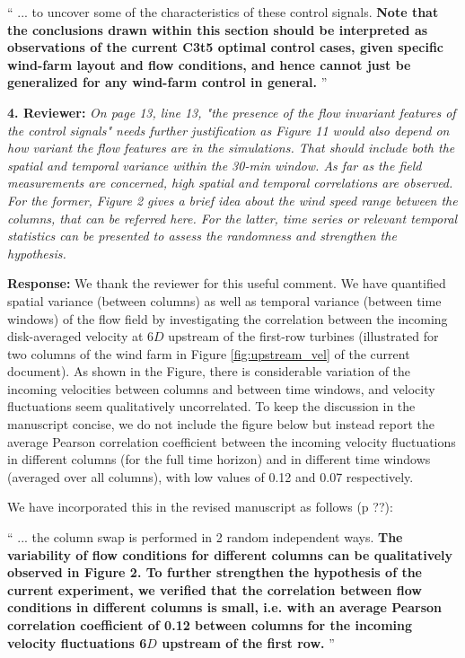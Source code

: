 \documentclass[]{article}
\begin{document}
`` 
... to uncover some of the characteristics of these control signals. \textbf{Note that the conclusions drawn within this section should be interpreted as observations of the current C3t5 optimal control cases, given specific wind-farm layout and flow conditions, and hence cannot just be generalized for any wind-farm control in general.}
''


\dotfill

\textbf{4. Reviewer: } \textit{On page 13, line 13, "the presence of the flow invariant features of the control signals"
	needs further justification as Figure 11 would also depend on how variant the flow
	features are in the simulations. That should include both the spatial and temporal
	variance within the 30-min window. As far as the field measurements are concerned,
	high spatial and temporal correlations are observed. For the former, Figure 2 gives a
	brief idea about the wind speed range between the columns, that can be referred here.
	For the latter, time series or relevant temporal statistics can be presented to assess the
	randomness and strengthen the hypothesis.}

\textbf{Response: } We thank the reviewer for this useful comment. We have quantified spatial variance (between columns) as well as temporal variance (between time windows) of the flow field by investigating the correlation between the incoming disk-averaged velocity at 6$D$ upstream of the first-row turbines (illustrated for two columns of the wind farm in Figure \ref{fig:upstream_vel} of the current document). As shown in the Figure, there is considerable variation of the incoming velocities between columns and between time windows, and velocity fluctuations seem qualitatively uncorrelated. To keep the discussion in the manuscript concise, we do not include the figure below but instead report the average Pearson correlation coefficient between the incoming velocity fluctuations in different columns (for the full time horizon) and in different time windows (averaged over all columns), with low values of 0.12 and 0.07 respectively. 

We have incorporated this in the revised manuscript as follows (p ??): 

``
... the column swap is performed in 2 random independent ways. \textbf{The variability of flow conditions for different columns can be qualitatively observed in Figure 2. To further strengthen the hypothesis of the current experiment, we verified that the  correlation between flow conditions in different columns is small, i.e. with an average Pearson correlation coefficient of 0.12 between columns for the incoming velocity fluctuations 6$D$ upstream of the first row.}
''
\end{document}
